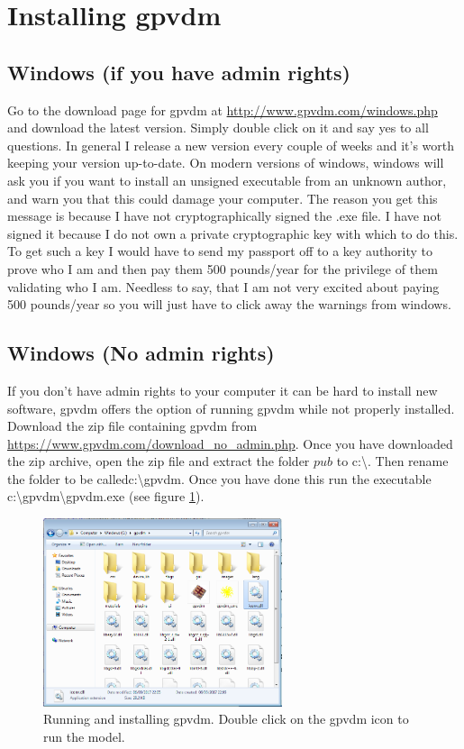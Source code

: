 \newpage
\section{Installing gpvdm}

\subsection{Windows (if you have admin rights)}
Go to the download page for gpvdm at \url{http://www.gpvdm.com/windows.php} and download the latest version.  Simply double click on it and say yes to all questions.  In general I release a new version every couple of weeks and it's worth keeping your version up-to-date. On modern versions of windows, windows will ask you if you want to install an unsigned executable from an unknown author, and warn you that this could damage your computer.  The reason you get this message is because I have not cryptographically signed the .exe file. I have not signed it because I do not own a private cryptographic key with which to do this.  To get such a key I would have to send my passport off to a key authority to prove who I am and then pay them 500 pounds/year for the privilege of them validating who I am.  Needless to say, that I am not very excited about paying 500 pounds/year so you will just have to click away the warnings from windows.

\subsection{Windows (No admin rights)}
If you don't have admin rights to your computer it can be hard to install new software, gpvdm offers the option of running gpvdm while not properly installed.  Download the zip file containing gpvdm from \url{https://www.gpvdm.com/download_no_admin.php}.  Once you have downloaded the zip archive, open the zip file and extract the folder $pub$ to c:\textbackslash . Then rename the folder to be calledc:\textbackslash gpvdm.  Once you have done this run the executable c:\textbackslash gpvdm\textbackslash gpvdm.exe (see figure \ref{fig:directory}).

\begin{figure}[H]
\centering
\includegraphics[width=70mm]{./images/dir.png}
\caption{Running and installing gpvdm.  Double click on the gpvdm icon to run the model.}
\label{fig:directory}
\end{figure}

